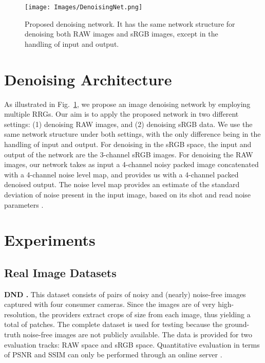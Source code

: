\documentclass[10pt,twocolumn,letterpaper]{article}
\begin{document}
\begin{figure}[t!]
\begin{center}
 \texttt{[image: Images/DenoisingNet.png]}  
\end{center}\vspace{-1.4em}
    \caption{Proposed denoising network. It has the same network structure for denoising both RAW images and sRGB images, except in the handling of input and output.}\vspace{-1.5em}
    \label{Fig:denoising network}
\end{figure}



\section{Denoising Architecture}
As illustrated in Fig.~\ref{Fig:denoising network}, we propose an image denoising network by employing multiple RRGs. 
Our aim is to  apply the proposed network in two different settings: (1) denoising RAW images, and (2) denoising sRGB data. We use the same network structure under both settings, with the only difference being in the handling of input and output. 
For denoising in the sRGB space, the input and output of the network are the 3-channel sRGB images. 
For denoising the RAW images, our network takes as input a 4-channel noisy packed image concatenated with a 4-channel noise level map, and provides us with a 4-channel packed denoised output. 
The noise level map provides an estimate of the standard deviation of noise present in the input image, based on its shot and read noise parameters \cite{Brooks2019}. 




\section{Experiments}


\subsection{Real Image Datasets}
\noindent \textbf{DND \cite{dnd}.} This dataset consists of  pairs of noisy and (nearly) noise-free images captured with four consumer cameras.  
Since the images are of very high-resolution, the providers extract  crops of size  from each image, thus yielding a total of  patches. 
The complete dataset is used for testing because the ground-truth noise-free images are not publicly available. 
The data is provided for two evaluation tracks: RAW space and sRGB space. 
Quantitative evaluation in terms of PSNR and SSIM can only be performed through an online server \cite{dndwebsite}. 
\end{document}
